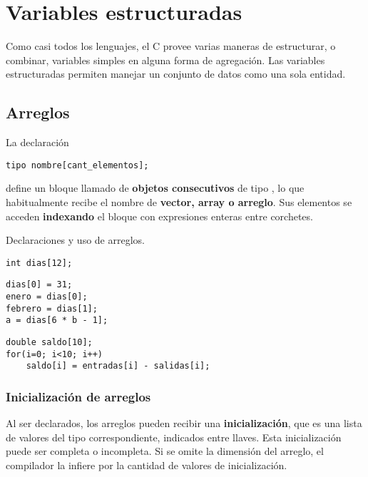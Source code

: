 


\chapter{Variables estructuradas}

Como casi todos los lenguajes, el C provee varias maneras de estructurar, o combinar, variables simples en
alguna forma de agregación. Las variables estructuradas permiten manejar un conjunto de datos como una sola entidad.

\section{Arreglos}
La declaración
\begin{lstlisting}
tipo nombre[cant_elementos];
\end{lstlisting}

define un bloque llamado  de  \textbf{objetos consecutivos} de tipo
, lo que habitualmente recibe el nombre de \textbf{vector, array o arreglo}. Sus
elementos se acceden \textbf{indexando} el bloque con expresiones enteras entre
corchetes.

\begin{ejemplo}
Declaraciones y uso de arreglos.
\begin{lstlisting}
int dias[12];
\end{lstlisting}
\begin{lstlisting}
dias[0] = 31;
enero = dias[0];
febrero = dias[1];
a = dias[6 * b - 1];
\end{lstlisting}
\begin{lstlisting}
double saldo[10];
for(i=0; i<10; i++)
    saldo[i] = entradas[i] - salidas[i];
\end{lstlisting}
\end{ejemplo}



\subsection{Inicialización de arreglos}

Al ser declarados, los arreglos pueden recibir una \textbf{inicialización}, que es una
lista de valores del tipo correspondiente, indicados entre llaves. Esta
inicialización puede ser completa o incompleta. Si se omite la dimensión del
arreglo, el compilador la infiere por la cantidad de valores de inicialización.

